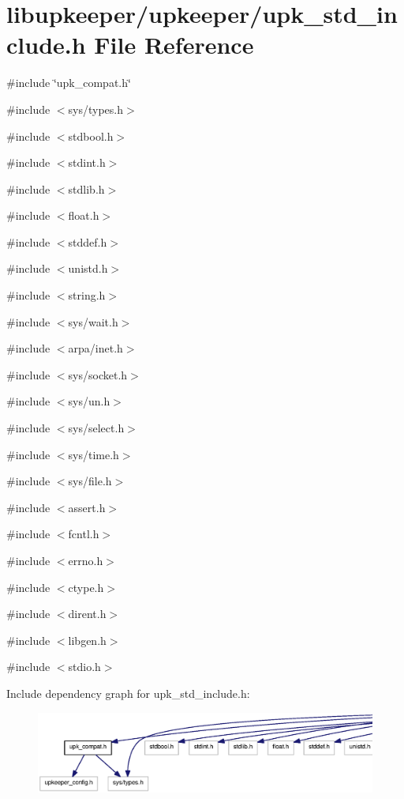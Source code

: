 \section{libupkeeper/upkeeper/upk\_\-std\_\-include.h File Reference}
\label{upk__std__include_8h}
{\ttfamily \#include \char`\"{}upk\_\-compat.h\char`\"{}}\par
{\ttfamily \#include $<$sys/types.h$>$}\par
{\ttfamily \#include $<$stdbool.h$>$}\par
{\ttfamily \#include $<$stdint.h$>$}\par
{\ttfamily \#include $<$stdlib.h$>$}\par
{\ttfamily \#include $<$float.h$>$}\par
{\ttfamily \#include $<$stddef.h$>$}\par
{\ttfamily \#include $<$unistd.h$>$}\par
{\ttfamily \#include $<$string.h$>$}\par
{\ttfamily \#include $<$sys/wait.h$>$}\par
{\ttfamily \#include $<$arpa/inet.h$>$}\par
{\ttfamily \#include $<$sys/socket.h$>$}\par
{\ttfamily \#include $<$sys/un.h$>$}\par
{\ttfamily \#include $<$sys/select.h$>$}\par
{\ttfamily \#include $<$sys/time.h$>$}\par
{\ttfamily \#include $<$sys/file.h$>$}\par
{\ttfamily \#include $<$assert.h$>$}\par
{\ttfamily \#include $<$fcntl.h$>$}\par
{\ttfamily \#include $<$errno.h$>$}\par
{\ttfamily \#include $<$ctype.h$>$}\par
{\ttfamily \#include $<$dirent.h$>$}\par
{\ttfamily \#include $<$libgen.h$>$}\par
{\ttfamily \#include $<$stdio.h$>$}\par
Include dependency graph for upk\_\-std\_\-include.h:\nopagebreak
\begin{figure}[H]
\begin{center}
\leavevmode
\includegraphics[width=400pt]{upk__std__include_8h__incl}
\end{center}
\end{figure}
